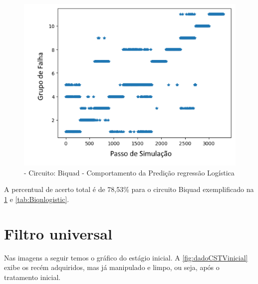 \begin{itemize}
  \begin{figure}[H]
        \begin{center}
        \includegraphics[width=12.5cm]{./01_Pre_textuais/biquad_figs/LogisticRegression_Biquad_Highpass_Filter_mc_+_4bitPRBS_[FALHA]raw.png}
        \caption{\label{fig:LogisticRegressionClassifieBiq}- Circuito: Biquad - Comportamento da Predição regressão Logística }
        \end{center}
        \end{figure}

A percentual de acerto total é de 78,53\% para o circuito Biquad exemplificado na \ref{fig:LogisticRegressionClassifieBiq} e \ref{tab:Biqnlogistic}. 


\end{itemize} 

\section{\textbf{Filtro universal}}


 Nas imagens a seguir temos o gráfico do estágio inicial. A  \ref{fig:dadoCSTVinicial} exibe os recém adquiridos, mas já manipulado e limpo, ou seja, após o tratamento inicial. 
  
